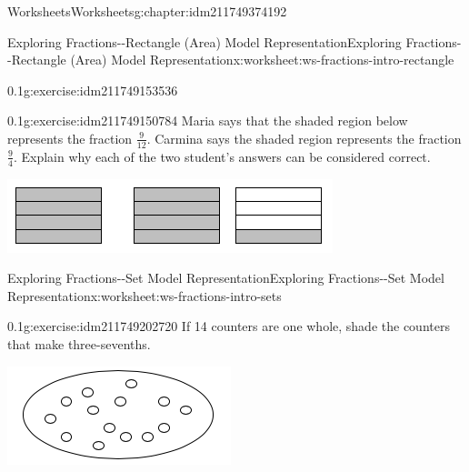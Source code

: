 \documentclass[twoside,11pt,]{book}
\begin{document}
\begin{chapterptx}{Worksheets}{}{Worksheets}{}{}{g:chapter:idm211749374192}
\begin{worksheet-section-numberless}{Exploring Fractions-{}-{}Rectangle (Area) Model Representation}{}{Exploring Fractions-{}-{}Rectangle (Area) Model Representation}{}{}{x:worksheet:ws-fractions-intro-rectangle}
\begin{divisionexercise}{4}{}{0.1}{g:exercise:idm211749153536}
\begin{sidebyside}{1}{0.3}{0.3}{0}
\begin{sbspanel}{0.4}
\end{sbspanel}%
\end{sidebyside}%
%
\end{divisionexercise}%
\begin{divisionexercise}{5}{}{0.1}{g:exercise:idm211749150784}%
Maria says that the shaded region below represents the fraction \(\frac{9}{12} \). Carmina says the shaded region represents the fraction \(\frac{9}{4} \). Explain why each of the two student’s answers can be considered correct. \begin{sidebyside}{1}{0.25}{0.25}{0}%
\begin{sbspanel}{0.5}%
\includegraphics[width=1\linewidth]{images/nine-fourths-vs-twelfths.png}
\end{sbspanel}%
\end{sidebyside}%
%
\end{divisionexercise}%
\end{worksheet-section-numberless}
\restoregeometry
%
%
\typeout{************************************************}
\typeout{************************************************}
%
\begin{worksheet-section-numberless}{Exploring Fractions-{}-{}Set Model Representation}{}{Exploring Fractions-{}-{}Set Model Representation}{}{}{x:worksheet:ws-fractions-intro-sets}
\begin{divisionexercise}{1}{}{0.1}{g:exercise:idm211749202720}%
If 14 counters are one whole, shade the counters that make three-sevenths. \begin{sidebyside}{1}{0.35}{0.35}{0}%
\begin{sbspanel}{0.3}%
\includegraphics[width=1\linewidth]{images/fourteen-counters.png}

\end{sbspanel}
\end{sidebyside}
\end{divisionexercise}
\end{worksheet-section-numberless}
\end{chapterptx}
\end{document}
